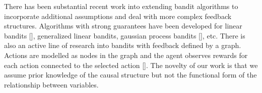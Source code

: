




There has been substantial recent work into extending bandit algorithms to incorporate additional assumptions and deal with more complex feedback structures. Algorithms with strong guarantees have been developed for linear bandits [], generalized linear bandits, gaussian process bandits [], etc. There is also an active line of research into bandits with feedback defined by a graph. Actions are modelled as nodes in the graph and the agent observes rewards for each action connected to the selected action []. The novelty of our work is that we assume prior knowledge of the causal structure but not the functional form of the relationship between variables.   

